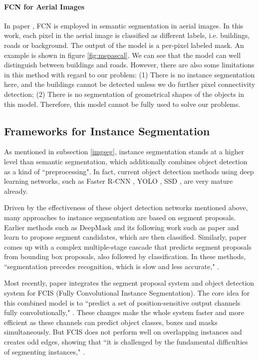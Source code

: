 

\paragraph{FCN for Aerial Images} In paper \cite{mspascal}, FCN is employed in semantic segmentation in aerial images. In this work, each pixel in the aerial image is classified as different labels, i.e. buildings, roads or background. The output of the model is a per-pixel labeled mask. An example is shown in figure \ref{fig:mspascal}. We can see that the model can well distinguish between buildings and roads. However, there are also some limitations in this method with regard to our problem: (1) There is no instance segmentation here, and the buildings cannot be detected unless we do further pixel connectivity detection; (2) There is no segmentation of geometrical shapes of the objects in this model. Therefore, this model cannot be fully used to solve our problems.

\subsection{Frameworks for Instance Segmentation}\label{dlistseg}
As mentioned in subsection \ref{imgseg}, instance segmentation stands at a higher level than semantic segmentation, which additionally combines object detection as a kind of ``preprocessing". In fact, current object detection methods using deep learning networks, such as Faster R-CNN \cite{fasterrcnn}, YOLO \cite{yolo}, SSD \cite{ssd}, are very mature already.

Driven by the effectiveness of these object detection networks mentioned above, many approaches to instance segmentation are based on segment proposals. Earlier methods such as DeepMask \cite{deepmask} and its following work such as paper \cite{pedroinsseg} and \cite{daiinsseg1} learn to propose segment candidates, which are then classified. Similarly, paper \cite{daiinsseg} comes up with a complex multiple-stage cascade that predicts segment proposals from bounding box proposals, also followed by classification. In these methods, ``segmentation precedes recognition, which is slow and less accurate," \cite{maskrcnn}.

Most recently, paper \cite{liinsseg} integrates the segment proposal system and object detection system for FCIS (Fully Convolutional Instance Segmentation). The core idea for this combined model is to ``predict a set of position-sensitive output channels fully convolutionally," \cite{maskrcnn}. These changes make the whole system faster and more efficient as these channels can predict object classes, boxes and masks simultaneously. But FCIS does not perform well on overlapping instances and creates odd edges, showing that ``it is challenged by the fundamental difficulties of segmenting instances," \cite{maskrcnn}.

